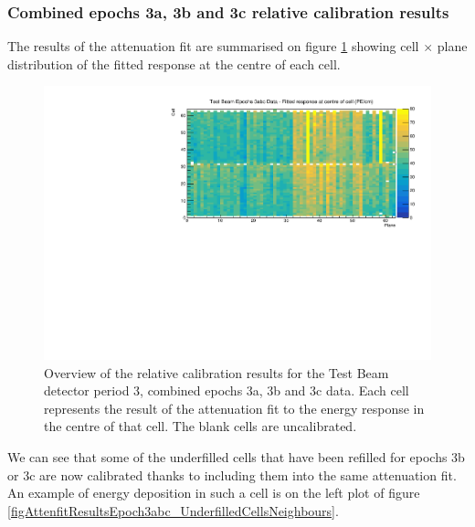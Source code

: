 \documentclass[12pt,a4paper]{article}
\begin{document}
\subsubsection*{Combined epochs 3a, 3b and 3c relative calibration results}

The results of the attenuation fit are summarised on figure \ref{figCellCentreResponseEp3abc} showing cell $\times$ plane distribution of the fitted response at the centre of each cell.

\begin{figure}[!hbtp]
\centering
\includegraphics[width=\textwidth]{Plots/CellResponseAtCentre_epoch3abc_Limited.pdf}
\caption{Overview of the relative calibration results for the Test Beam detector period 3, combined epochs 3a, 3b and 3c data. Each cell represents the result of the attenuation fit to the energy response in the centre of that cell. The blank cells are uncalibrated.}
\label{figCellCentreResponseEp3abc}
\end{figure}

We can see that some of the underfilled cells that have been refilled for epochs 3b or 3c are now calibrated thanks to including them into the same attenuation fit. An example of energy deposition in such a cell is on the left plot of figure \ref{figAttenfitResultsEpoch3abc_UnderfilledCellsNeighbours}.
\end{document}
